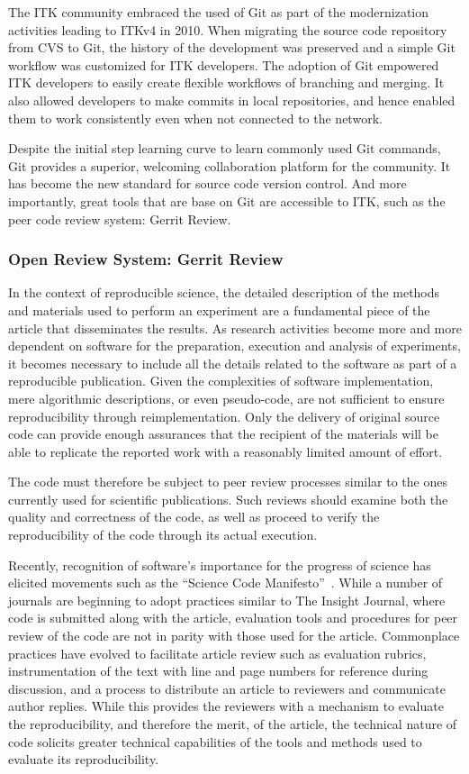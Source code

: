 \documentclass{frontiersENG} %
\begin{document}
The ITK community embraced the used of Git as part of the modernization
activities leading to ITKv4 in 2010.  When migrating the source code repository
from CVS to Git, the history of the development was preserved and a simple Git
workflow was customized for ITK developers.  The adoption of Git empowered ITK
developers to easily create flexible workflows of branching and merging. It
also allowed developers to make commits in local repositories, and hence
enabled them to work consistently even when not connected to the network.

Despite the initial step learning curve to learn commonly used Git commands,
Git provides a superior, welcoming collaboration platform for the community. It
has become the new standard for source code version control.  And more
importantly, great tools that are base on Git are accessible to ITK, such as
the peer code review system: Gerrit Review.


\subsubsection{Open Review System: Gerrit Review}

In the context of reproducible science, the detailed description of the methods
and materials used to perform an experiment are a fundamental piece of the
article that disseminates the results. As research activities become more and
more dependent on software for the preparation, execution and analysis of
experiments, it becomes necessary to include all the details related to the
software as part of a reproducible publication. Given the complexities of
software implementation, mere algorithmic descriptions, or even pseudo-code,
are not sufficient to ensure reproducibility through reimplementation. Only the
delivery of original source code can provide enough assurances that the
recipient of the materials will be able to replicate the reported work with a
reasonably limited amount of effort.

The code must therefore be subject to peer review processes similar to the ones
currently used for scientific publications. Such reviews should examine both
the quality and correctness of the code, as well as proceed to verify the
reproducibility of the code through its actual execution.

Recently, recognition of software's importance for the progress of science has
elicited movements such as the ``Science Code Manifesto''~\cite{Barnes2011}.
While a number of journals are beginning to adopt practices similar to The
Insight Journal, where code is submitted along with the article, evaluation
tools and procedures for peer review of the code are not in parity with those
used for the article. Commonplace practices have evolved to facilitate article
review such as evaluation rubrics, instrumentation of the text with line and
page numbers for reference during discussion, and a process to distribute an
article to reviewers and communicate author replies.  While this provides the
reviewers with a mechanism to evaluate the reproducibility, and therefore the
merit, of the article, the technical nature of code solicits greater technical
capabilities of the tools and methods used to evaluate its reproducibility.
\end{document}
